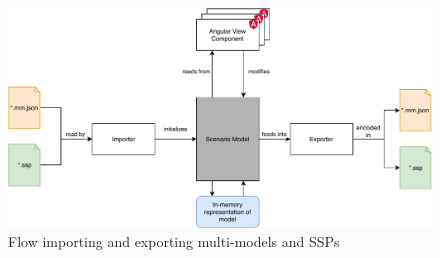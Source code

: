 \begin{figure}[H]
\centering
\includegraphics[width=\columnwidth]{Images/architecture_serialization.pdf}
\caption{Flow importing and exporting multi-models and SSPs}
\label{fig:architecture_serialization}
\end{figure}
